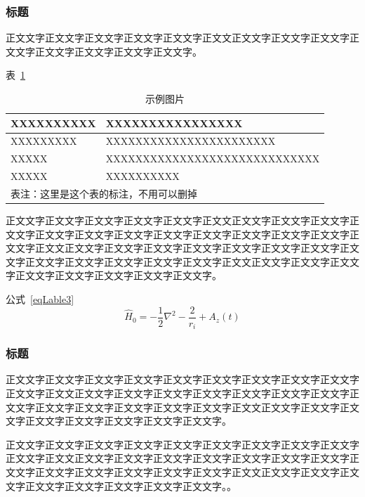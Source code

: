 \documentclass[twoside]{thesis-cls-Miya} %
\begin{document}
\subsubsection{标题}
正文文字正文文字正文文字正文文字正文文字正文文正文文字正文文字正文文字正文文字正文文字正文文字正文文字正文文字。

表~\ref{tableLable2} 

\begin{table}[!htb]
	\centering
	\caption{示例图片}
	\label{tableLable2}
	\renewcommand{\arraystretch}{1.2}
	\setlength{\tabcolsep}{1ex}
	\begin{tabular}{l  p{}}
		\toprule
		XXXXXXXXXX & XXXXXXXXXXXXXXXX\\
		\midrule
		XXXXXXXXX& XXXXXXXXXXXXXXXXXXXXXXX \\
		XXXXX & XXXXXXXXXXXXXXXXXXXXXXXXXXXXX \\
		XXXXX & XXXXXXXXXX \\
		\bottomrule
		\multicolumn{2}{l}{表注：这里是这个表的标注，不用可以删掉}
	\end{tabular}
\end{table}

正文文字正文文字正文文字正文文字正文文字正文文正文文字正文文字正文文字正文文字正文文字正文文字正文文字正文文字正文文字正文文字正文文字正文文字正文文字正文文正文文字正文文字正文文字正文文字正文文字正文文字正文文字正文文字正文文字正文文字正文文字正文文字正文文字正文文正文文字正文文字正文文字正文文字正文文字正文文字正文文字正文文字。

公式~\ref{eqLable3} 
\begin{equation}\label{eqLable3}
\widehat{H}_0 = -\frac{1}{2} \nabla ^2 - \frac{2}{r_i}  + A_z(t) 
\end{equation}

\subsubsection{标题}
正文文字正文文字正文文字正文文字正文文字正文文字正文文字正文文字正文文字正文文字正文文正文文字正文文字正文文字正文文字正文文字正文文字正文文字正文文字正文文字正文文字正文文字正文文字正文文字正文文正文文字正文文字正文文字正文文字正文文字正文文字正文文字正文文字。


正文文字正文文字正文文字正文文字正文文字正文文字正文文字正文文字正文文字正文文字正文文正文文字正文文字正文文字正文文字正文文字正文文字正文文字正文文字正文文字正文文字正文文字正文文字正文文字正文文正文文字正文文字正文文字正文文字正文文字正文文字正文文字正文文字。\cite{yangkang2019,yuanxunlai,halisen2019}。
\end{document}
